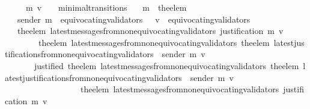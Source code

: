 \begin{isabellebody}
\ \ {\isachardoublequoteopen}{\isasymforall}\ {\isasymsigma}\ {\isasymsigma}{\isacharprime}\ m{\isacharprime}\ v{\isachardot}\ {\isacharparenleft}{\isasymsigma}{\isacharcomma}\ {\isasymsigma}{\isacharprime}{\isacharparenright}\ {\isasymin}\ minimal{\isacharunderscore}transitions\isanewline
\ \ {\isasymlongrightarrow}\ m{\isacharprime}\ {\isacharequal}\ the{\isacharunderscore}elem\ {\isacharparenleft}{\isasymsigma}{\isacharprime}\ {\isacharminus}\ {\isasymsigma}{\isacharparenright}\isanewline
\ \ {\isasymlongrightarrow}\ sender\ m{\isacharprime}\ {\isasymnotin}\ equivocating{\isacharunderscore}validators\ {\isasymsigma}\ {\isasymand}\ v\ {\isasymnotin}\ equivocating{\isacharunderscore}validators\ {\isasymsigma}{\isacharprime}\isanewline
\ \ {\isasymlongrightarrow}\ the{\isacharunderscore}elem\ {\isacharparenleft}latest{\isacharunderscore}messages{\isacharunderscore}from{\isacharunderscore}non{\isacharunderscore}equivocating{\isacharunderscore}validators\ {\isacharparenleft}justification\ m{\isacharprime}{\isacharparenright}\ v{\isacharparenright}\ \isanewline
\ \ \ \ \ \ \ {\isacharequal}\ the{\isacharunderscore}elem\ {\isacharparenleft}latest{\isacharunderscore}messages{\isacharunderscore}from{\isacharunderscore}non{\isacharunderscore}equivocating{\isacharunderscore}validators\ {\isacharparenleft}the{\isacharunderscore}elem\ {\isacharparenleft}latest{\isacharunderscore}justifications{\isacharunderscore}from{\isacharunderscore}non{\isacharunderscore}equivocating{\isacharunderscore}validators\ {\isasymsigma}\ {\isacharparenleft}sender\ m{\isacharprime}{\isacharparenright}{\isacharparenright}{\isacharparenright}\ v{\isacharparenright}\isanewline
\ \ \ \ \ \ {\isasymor}\ justified\ {\isacharparenleft}the{\isacharunderscore}elem\ {\isacharparenleft}latest{\isacharunderscore}messages{\isacharunderscore}from{\isacharunderscore}non{\isacharunderscore}equivocating{\isacharunderscore}validators\ {\isacharparenleft}the{\isacharunderscore}elem\ {\isacharparenleft}latest{\isacharunderscore}justifications{\isacharunderscore}from{\isacharunderscore}non{\isacharunderscore}equivocating{\isacharunderscore}validators\ {\isasymsigma}\ {\isacharparenleft}sender\ m{\isacharprime}{\isacharparenright}{\isacharparenright}{\isacharparenright}\ v{\isacharparenright}{\isacharparenright}\ \isanewline
\ \ \ \ \ \ \ \ \ \ \ \ \ \ \ \ \ \ {\isacharparenleft}the{\isacharunderscore}elem\ {\isacharparenleft}latest{\isacharunderscore}messages{\isacharunderscore}from{\isacharunderscore}non{\isacharunderscore}equivocating{\isacharunderscore}validators\ {\isacharparenleft}justification\ m{\isacharprime}{\isacharparenright}\ v{\isacharparenright}{\isacharparenright}{\isachardoublequoteclose}\isanewline

\end{isabellebody}
